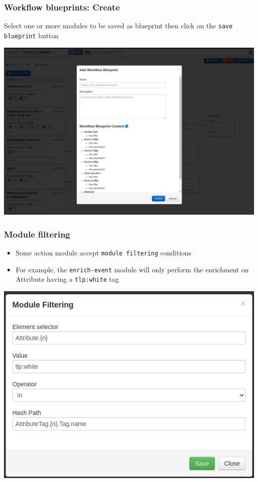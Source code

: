 \begin{frame}
    \frametitle{Workflow blueprints: Create}
    Select one or more modules to be saved as blueprint then click on the \texttt{save blueprint} button
    \begin{center}
        \includegraphics[width=0.85\linewidth]{pictures/blueprint-1.png}
    \end{center}
\end{frame}

\begin{frame}
    \frametitle{Module filtering}
    \begin{itemize}
        \item Some action module accept \texttt{module filtering} conditions
        \item For example, the \texttt{enrich-event} module will only perform the enrichment on Attribute having a \texttt{tlp:white} tag
    \end{itemize}
    \begin{center}
        \includegraphics[width=0.7\linewidth]{pictures/module-filtering.png}
    \end{center}
\end{frame}

